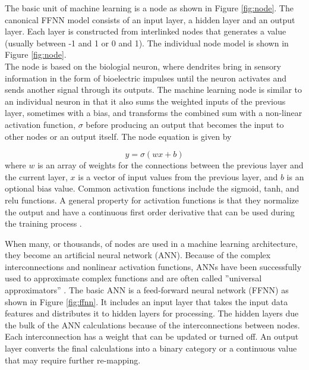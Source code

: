 \documentclass[twoside,twocolumn]{article}
\begin{document}
The basic unit of machine learning is a node as shown in  Figure \ref{fig:node}. The canonical FFNN model consists of an input layer, a hidden layer and an output layer. Each layer is constructed from interlinked nodes that generates a value (usually between -1 and 1 or 0 and 1). The individual node model is shown in Figure \ref{fig:node}. \\

The node is based on the biologial neuron, where dendrites bring in sensory information in the form of bioelectric impulses until the neuron activates and sends another signal through its outputs. The machine learning node is similar to an individual neuron in that it also sums the weighted inputs of the previous layer, sometimes with a bias, and transforms the combined sum with a non-linear activation function, $\sigma$ before producing an output that becomes the input to other nodes or an output itself. The node  equation is given by

\begin{equation}
\label{eq:perceptron}
y= \sigma(wx+b)
\end{equation}
\noindent
where $w$ is an array of weights for the connections between the previous layer and the current layer, $x$ is a vector of input values from the previous layer, and $b$ is an optional bias value. Common activation functions include the sigmoid, tanh, and relu functions. A general property for activation functions is that they normalize the output and have a continuous first order derivative that can be used during the training process \citep{Goodfellow2016}. 

When many, or thousands, of nodes are used in a machine learning architecture, they become an artificial neural network (ANN). Because of the complex interconnections and nonlinear activation functions, ANNs have been successfully used to approximate complex functions and are often called ''universal approximators'' \citep{Sifaoui2008, Sonoda2017}. The basic ANN is a feed-forward neural network (FFNN) as shown in Figure \ref{fig:ffnn}. It includes an input layer that takes the input data features and distributes it to hidden layers for processing. The hidden layers due the bulk of the ANN calculations because of the interconnections between nodes. Each interconnection has a weight that can be updated or turned off. An output layer converts the final calculations into a binary category or a continuous value that may require further re-mapping.
\end{document}
